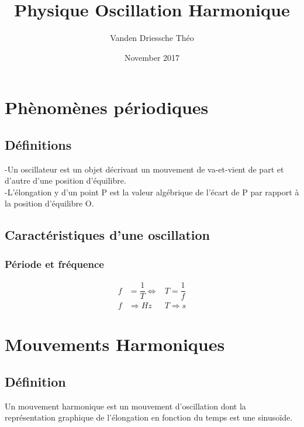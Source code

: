 \documentclass[11pt]{article}
\title{Physique Oscillation Harmonique}
\author{Vanden Driessche Théo}
\date{November 2017}
\begin{document}
\maketitle

\newpage
\section{Phènomènes périodiques}
\subsection{Définitions}
-Un oscillateur est un objet décrivant un mouvement de va-et-vient de part et d'autre d'une position d'équilibre.\\
-L'élongation y d'un point P est la valeur algébrique de l'écart de P par rapport à la position d'équilibre O.

\subsection{Caractéristiques d'une oscillation}
\subsubsection{Période et fréquence}
\begin{align*}
        f&=\dfrac{1}{T} \Longleftrightarrow &T=\dfrac{1}{f} \\
        f& \Rightarrow Hz &T \Rightarrow s   
\end{align*}

\section{Mouvements Harmoniques}
\subsection{Définition}
Un mouvement harmonique est un mouvement d'oscillation dont la représentation graphique de l'élongation en fonction du temps est une sinusoïde.\\
\end{document}
